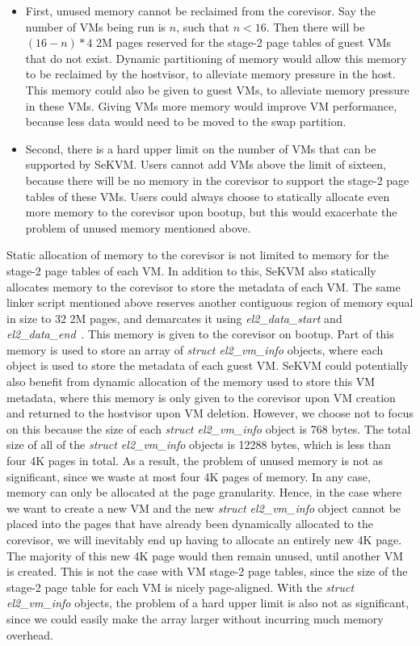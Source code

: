\begin{itemize}
    \item First, unused memory cannot be reclaimed from the corevisor. Say
    the number of VMs being run is $n$, such that $n < 16$. Then there will be
    $(16 - n) * 4$ 2M pages reserved for the stage-2 page tables of guest VMs that
    do not exist. Dynamic partitioning of memory would allow this memory to be reclaimed by the hostvisor, to
    alleviate memory pressure in the host. This memory could also be given to guest VMs, to
    alleviate memory pressure in these VMs. Giving VMs more memory would improve
    VM performance, because less data would need to be moved to the swap partition.
    \item Second, there is a hard upper limit on the number of VMs that can
    be supported by SeKVM. Users cannot add VMs above the limit of sixteen,
    because there will be no memory in the corevisor to support the stage-2
    page tables of these VMs. Users could always choose to statically allocate
    even more memory to the corevisor upon bootup, but this would exacerbate
    the problem of unused memory mentioned above.
\end{itemize}

Static allocation of memory to the corevisor is not limited to memory for the
stage-2 page tables of each VM. In addition to this, SeKVM also statically
allocates memory to the corevisor to store the metadata of each VM. The same linker script
mentioned above reserves another contiguous region of memory equal in size to 32
2M pages, and demarcates it using \textit{el2\_data\_start}
and \textit{el2\_data\_end}~\cite{vmlinux.lds.S}. This memory is given to the
corevisor on bootup. Part of this memory is used to
store an array of \textit{struct el2\_vm\_info} objects, where each object is
used to store the metadata of each guest VM. SeKVM could potentially also benefit
from dynamic allocation of the memory used to store this VM metadata, where
this memory is only given to the corevisor upon VM creation and returned to the
hostvisor upon VM deletion. However,
we choose not to focus on this because the size of each \textit{struct el2\_vm\_info} object
is 768 bytes. The total size of all of the \textit{struct el2\_vm\_info} objects
is 12288 bytes, which is less than four 4K pages in total. As a result, the
problem of unused memory is not as significant, since we waste at most four
4K pages of memory. In any case, memory can only be allocated at the
page granularity. Hence, in the case where we want to create a new VM and the new \textit{struct el2\_vm\_info} object
cannot be placed into the pages that have already been dynamically allocated to the corevisor, we will
inevitably end up having to allocate an entirely new 4K page. The majority of this new 4K page would then remain unused, until another VM is created. This
is not the case with VM stage-2 page tables, since the size of the stage-2 page
table for each VM is nicely page-aligned. With the \textit{struct el2\_vm\_info} objects, the problem of a hard upper limit
is also not as significant, since we could easily make the array larger without
incurring much memory overhead.

